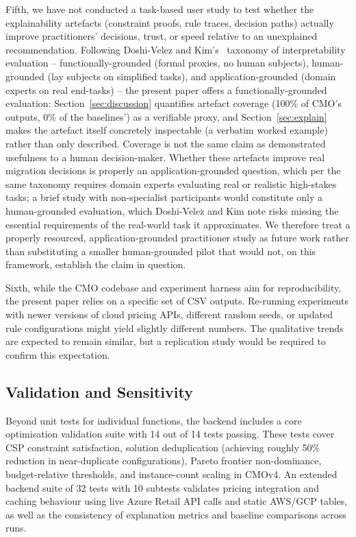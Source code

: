 \documentclass[journal]{IEEEtran}
\newcommand{\cmo}{CMO\xspace}
\newcommand{\cmofour}{CMOv4\xspace}
\begin{document}
Fifth, we have not conducted a task-based user study to test whether the
explainability artefacts (constraint proofs, rule traces, decision paths)
actually improve practitioners' decisions, trust, or speed relative to an
unexplained recommendation. Following Doshi-Velez and Kim's~\cite{doshi_rigorous}
taxonomy of interpretability evaluation -- functionally-grounded (formal
proxies, no human subjects), human-grounded (lay subjects on simplified
tasks), and application-grounded (domain experts on real end-tasks) -- the
present paper offers a functionally-grounded evaluation: Section~\ref{sec:discussion}
quantifies artefact coverage (100\% of \cmo's outputs, 0\% of the baselines')
as a verifiable proxy, and Section~\ref{sec:explain} makes the artefact
itself concretely inspectable (a verbatim worked example) rather than only
described. Coverage is not the same claim as demonstrated usefulness to a
human decision-maker. Whether these artefacts improve real migration
decisions is properly an application-grounded question, which per the same
taxonomy requires domain experts evaluating real or realistic high-stakes
tasks; a brief study with non-specialist participants would constitute only
a human-grounded evaluation, which Doshi-Velez and Kim note risks missing
the essential requirements of the real-world task it approximates. We
therefore treat a properly resourced, application-grounded practitioner
study as future work rather than substituting a smaller human-grounded
pilot that would not, on this framework, establish the claim in question.

Sixth, while the \cmo codebase and experiment harness aim for reproducibility,
the present paper relies on a specific set of CSV outputs. Re-running
experiments with newer versions of cloud pricing APIs, different random seeds, or
updated rule configurations might yield slightly different numbers. The
qualitative trends are expected to remain similar, but a replication study would
be required to confirm this expectation.

\subsection{Validation and Sensitivity}
\label{sec:validation}

Beyond unit tests for individual functions, the backend includes a core
optimisation validation suite with 14 out of 14 tests passing. These tests cover
CSP constraint satisfaction, solution deduplication (achieving roughly 50\%
reduction in near-duplicate configurations), Pareto frontier non-dominance,
budget-relative thresholds, and instance-count scaling in \cmofour. An extended
backend suite of 32 tests with 10 subtests validates pricing integration and
caching behaviour using live Azure Retail API calls and static AWS/GCP tables,
as well as the consistency of explanation metrics and baseline comparisons
across runs.
\end{document}
